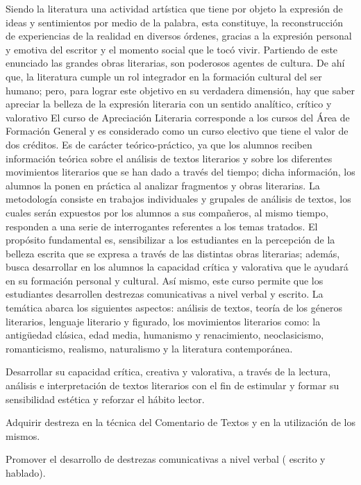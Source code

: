 \begin{syllabus}


\begin{justification}
Siendo la literatura una actividad artística que tiene por objeto la expresión de ideas y sentimientos por medio de la palabra, esta constituye, la reconstrucción de experiencias de la realidad en diversos órdenes, gracias a la expresión personal y emotiva del escritor y el momento social que le tocó vivir.
Partiendo de este enunciado las grandes obras literarias, son poderosos agentes de cultura. De ahí que, la literatura cumple un rol integrador en la formación cultural del ser humano; pero,  para lograr este objetivo en su verdadera dimensión, hay que saber apreciar la belleza de la expresión literaria con un sentido analítico, crítico y valorativo
El curso de Apreciación Literaria corresponde a los cursos del Área de Formación General y es considerado como un curso electivo que tiene el valor de dos créditos. Es de carácter teórico-práctico, ya que los alumnos reciben información teórica sobre el análisis de textos literarios y sobre los diferentes movimientos literarios que se han dado a través del tiempo; dicha información, los alumnos la ponen en práctica al analizar fragmentos y obras literarias. La metodología consiste en trabajos individuales y grupales de análisis de textos, los cuales serán expuestos por los alumnos a sus compañeros, al mismo tiempo, responden a una serie de interrogantes referentes a los temas tratados. El propósito fundamental es, sensibilizar a los estudiantes en la percepción de la belleza escrita que se expresa a través de las distintas obras literarias; además, busca desarrollar en los alumnos la capacidad crítica y valorativa que le ayudará en su formación personal y cultural. Así mismo, este curso permite que los estudiantes desarrollen destrezas comunicativas a nivel verbal y escrito.
La temática abarca los siguientes aspectos: análisis de textos, teoría de los géneros literarios, lenguaje literario y figurado, los movimientos literarios como: la antigüedad clásica, edad media, humanismo y renacimiento, neoclasicismo, romanticismo, realismo, naturalismo y la literatura contemporánea.
\end{justification}

\begin{goals}
\item Desarrollar su capacidad crítica, creativa y valorativa, a través de la lectura, análisis e interpretación de textos literarios con el fin de estimular y formar su sensibilidad estética y reforzar el hábito lector.
\item Adquirir destreza en la técnica del Comentario de Textos y en la utilización de los mismos.
\item Promover el desarrollo de destrezas comunicativas a nivel verbal ( escrito y hablado).
\end{goals}


\end{syllabus}
